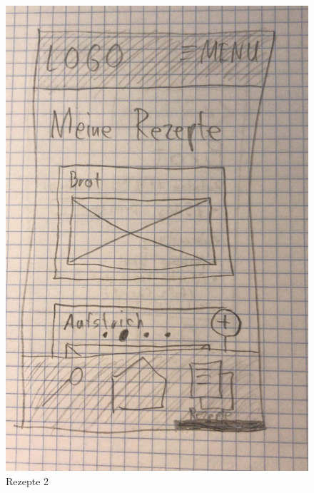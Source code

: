 \begin{figure}[H]
  \includegraphics[width=\linewidth]{./exercise13/Rezepte2.jpeg}
  \caption{Rezepte 2}
\end{figure}

